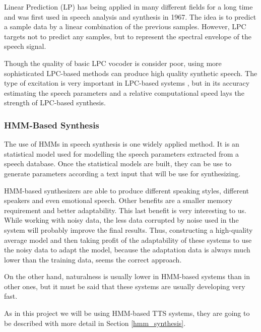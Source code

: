 Linear Prediction (LP) has being applied in many different fields for a long time and was first used in speech analysis and synthesis in 1967. The idea is to predict a sample data by a linear combination of the previous samples. However, LPC targets not to predict any samples, but to represent the spectral envelope of the speech signal. 

Though the quality of basic LPC vocoder is consider poor, using more sophisticated LPC-based methods can produce high quality synthetic speech. The type of excitation is very important in LPC-based systems \cite{TuomoMSc}, but in its accuracy estimating the speech parameters and a relative computational speed lays the strength of LPC-based synthesis.

\subsubsection{HMM-Based Synthesis}
\label{hmm_based_speech_synthesis}
The use of HMMs in speech synthesis is one widely applied method. It is an statistical model used for modelling the speech parameters extracted from a speech database. Once the statistical models are built, they can be use to generate parameters according a text input that will be use for synthesizing. 

HMM-based synthesizers are able to produce different speaking styles, different speakers and even emotional speech. Other benefits are a smaller memory requirement and better adaptability. This last benefit is very interesting to us. While working with noisy data, the less data corrupted by noise used in the system will probably improve the final results. Thus, constructing a high-quality average model and then taking profit of the adaptability of these systems to use the noisy data to adapt the model, because the adaptation data is always much lower than the training data, seems the correct approach.

On the other hand, naturalness is usually lower in HMM-based systems than in other ones, but it must be said that these systems are usually developing very fast. 

As in this project we will be using HMM-based TTS systems, they are going to be described with more detail in Section \ref{hmm_synthesis}.
